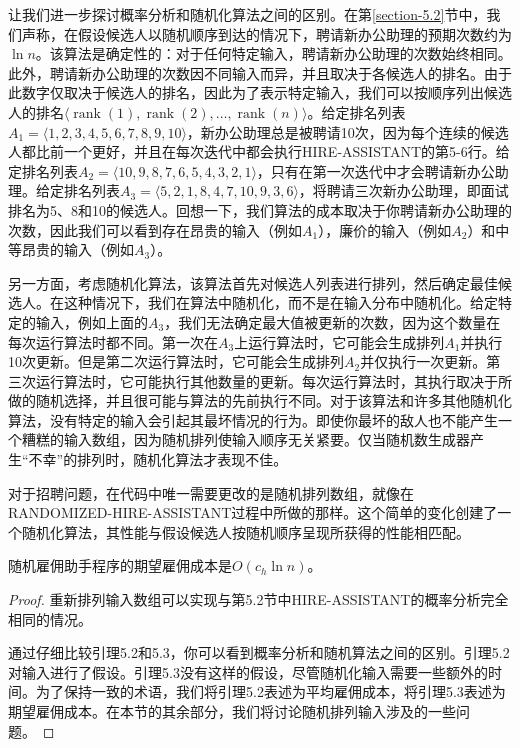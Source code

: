 \documentclass[lang=cn,newtx,10pt,scheme=chinese]{elegantbook}
\begin{document}
让我们进一步探讨概率分析和随机化算法之间的区别。在第\ref{section-5.2}节中，我们声称，在假设候选人以随机顺序到达的情况下，聘请新办公助理的预期次数约为$\ln n$。该算法是确定性的：对于任何特定输入，聘请新办公助理的次数始终相同。此外，聘请新办公助理的次数因不同输入而异，并且取决于各候选人的排名。由于此数字仅取决于候选人的排名，因此为了表示特定输入，我们可以按顺序列出候选人的排名$\langle\operatorname{rank}(1),\operatorname{rank}(2),\ldots,\operatorname{rank}(n)\rangle$。给定排名列表$A_1=\langle 1,2,3,4,5,6,7,8,9,10\rangle$，新办公助理总是被聘请10次，因为每个连续的候选人都比前一个更好，并且在每次迭代中都会执行HIRE-ASSISTANT的第5-6行。给定排名列表$A_2=\langle 10,9,8,7,6,5,4,3,2,1\rangle$，只有在第一次迭代中才会聘请新办公助理。给定排名列表$A_3=\langle 5,2,1,8,4,7,10,9,3,6\rangle$，将聘请三次新办公助理，即面试排名为5、8和10的候选人。回想一下，我们算法的成本取决于你聘请新办公助理的次数，因此我们可以看到存在昂贵的输入（例如$A_1$），廉价的输入（例如$A_2$）和中等昂贵的输入（例如$A_3$）。

另一方面，考虑随机化算法，该算法首先对候选人列表进行排列，然后确定最佳候选人。在这种情况下，我们在算法中随机化，而不是在输入分布中随机化。给定特定的输入，例如上面的$A_3$，我们无法确定最大值被更新的次数，因为这个数量在每次运行算法时都不同。第一次在$A_3$上运行算法时，它可能会生成排列$A_1$并执行10次更新。但是第二次运行算法时，它可能会生成排列$A_2$并仅执行一次更新。第三次运行算法时，它可能执行其他数量的更新。每次运行算法时，其执行取决于所做的随机选择，并且很可能与算法的先前执行不同。对于该算法和许多其他随机化算法，没有特定的输入会引起其最坏情况的行为。即使你最坏的敌人也不能产生一个糟糕的输入数组，因为随机排列使输入顺序无关紧要。仅当随机数生成器产生“不幸”的排列时，随机化算法才表现不佳。

对于招聘问题，在代码中唯一需要更改的是随机排列数组，就像在RANDOMIZED-HIRE-ASSISTANT过程中所做的那样。这个简单的变化创建了一个随机化算法，其性能与假设候选人按随机顺序呈现所获得的性能相匹配。

\begin{lemma}{}{}
随机雇佣助手程序的期望雇佣成本是$O(c_h \ln n)$。
\end{lemma}

\begin{proof}
重新排列输入数组可以实现与第5.2节中HIRE-ASSISTANT的概率分析完全相同的情况。

通过仔细比较引理5.2和5.3，你可以看到概率分析和随机算法之间的区别。引理5.2对输入进行了假设。引理5.3没有这样的假设，尽管随机化输入需要一些额外的时间。为了保持一致的术语，我们将引理5.2表述为平均雇佣成本，将引理5.3表述为期望雇佣成本。在本节的其余部分，我们将讨论随机排列输入涉及的一些问题。
\end{proof}
\end{document}

